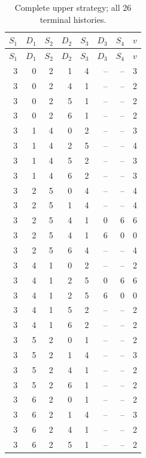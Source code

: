 \documentclass[11pt]{article}
\begin{document}
\begin{longtable}{rrrrrrrc}
\caption{Complete upper strategy; all 26 terminal histories.}\label{upper}\\
\toprule $S_1$&$D_1$&$S_2$&$D_2$&$S_3$&$D_3$&$S_4$&$v$\\\midrule\endfirsthead
\toprule $S_1$&$D_1$&$S_2$&$D_2$&$S_3$&$D_3$&$S_4$&$v$\\\midrule\endhead
3 & 0 & 2 & 1 & 4 & -- & -- & 3 \\
3 & 0 & 2 & 4 & 1 & -- & -- & 2 \\
3 & 0 & 2 & 5 & 1 & -- & -- & 2 \\
3 & 0 & 2 & 6 & 1 & -- & -- & 2 \\
3 & 1 & 4 & 0 & 2 & -- & -- & 3 \\
3 & 1 & 4 & 2 & 5 & -- & -- & 4 \\
3 & 1 & 4 & 5 & 2 & -- & -- & 3 \\
3 & 1 & 4 & 6 & 2 & -- & -- & 3 \\
3 & 2 & 5 & 0 & 4 & -- & -- & 4 \\
3 & 2 & 5 & 1 & 4 & -- & -- & 4 \\
3 & 2 & 5 & 4 & 1 & 0 & 6 & 6 \\
3 & 2 & 5 & 4 & 1 & 6 & 0 & 0 \\
3 & 2 & 5 & 6 & 4 & -- & -- & 4 \\
3 & 4 & 1 & 0 & 2 & -- & -- & 2 \\
3 & 4 & 1 & 2 & 5 & 0 & 6 & 6 \\
3 & 4 & 1 & 2 & 5 & 6 & 0 & 0 \\
3 & 4 & 1 & 5 & 2 & -- & -- & 2 \\
3 & 4 & 1 & 6 & 2 & -- & -- & 2 \\
3 & 5 & 2 & 0 & 1 & -- & -- & 2 \\
3 & 5 & 2 & 1 & 4 & -- & -- & 3 \\
3 & 5 & 2 & 4 & 1 & -- & -- & 2 \\
3 & 5 & 2 & 6 & 1 & -- & -- & 2 \\
3 & 6 & 2 & 0 & 1 & -- & -- & 2 \\
3 & 6 & 2 & 1 & 4 & -- & -- & 3 \\
3 & 6 & 2 & 4 & 1 & -- & -- & 2 \\
3 & 6 & 2 & 5 & 1 & -- & -- & 2 \\
\bottomrule\end{longtable}
\end{document}
